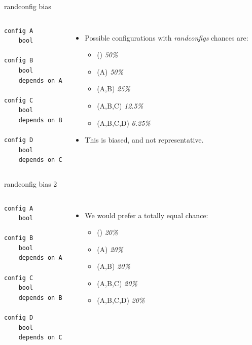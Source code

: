 \documentclass[mathserif,serif]{beamer}
\newenvironment{items}{
\begin{itemize}
  \setlength{\itemsep}{0pt}
  \setlength{\parskip}{7pt}
  \setlength{\parsep}{4pt}
}{\end{itemize}}
\begin{document}
\begin{frame}[t,fragile]{randconfig bias}

    \begin{columns}[T]

    \begin{lstlisting}
config A
    bool

config B
    bool
    depends on A

config C
    bool
    depends on B

config D
    bool
    depends on C
    \end{lstlisting}


    \begin{items}
        \item Possible configurations with \emph{randconfigs} chances  are:
        \begin{items}
            \item () \emph{50\%}
            \item (A) \emph{50\%}
            \item (A,B) \emph{25\%}
            \item (A,B,C) \emph{12.5\%}
            \item (A,B,C,D) \emph{6.25\%}
        \end{items}
        \item This is biased, and not representative.
    \end{items}

    \end{columns}
\end{frame}

\begin{frame}[t,fragile]{randconfig bias 2}

    \begin{columns}[T]

    \begin{lstlisting}
config A
    bool

config B
    bool
    depends on A

config C
    bool
    depends on B

config D
    bool
    depends on C
    \end{lstlisting}


    \begin{items}
        \item We would prefer a totally equal chance:
        \begin{items}
            \item () \emph{20\%}
            \item (A) \emph{20\%}
            \item (A,B) \emph{20\%}
            \item (A,B,C) \emph{20\%}
            \item (A,B,C,D) \emph{20\%}
        \end{items}
    \end{items}

    \end{columns}
\end{frame}
\end{document}
